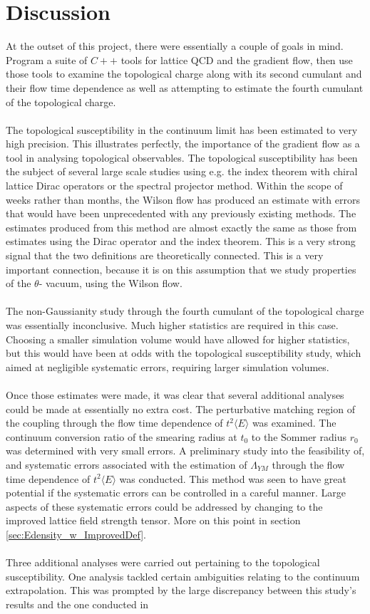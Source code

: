 \documentclass[a4paper,10pt]{book}
\begin{document}
\section{Discussion}
At the outset of this project, there were essentially a couple of goals in mind. Program a suite of $C++$ tools for lattice QCD and the gradient flow, then use those tools to examine the topological charge along with its second cumulant and their flow time dependence as well as attempting to estimate the fourth cumulant of the topological charge.\\\\The topological susceptibility in the continuum limit has been estimated to very high precision. This illustrates perfectly, the importance of the gradient flow as a tool in analysing topological observables. The topological susceptibility has been the subject of several large scale studies using e.g. the index theorem with chiral lattice Dirac operators or the spectral projector method. Within the scope of weeks rather than months, the Wilson flow has produced an estimate with errors that would have been unprecedented with any previously existing methods. The estimates produced from this method are almost exactly the same as those from estimates using the Dirac operator and the index theorem. This is a very strong signal that the two definitions are theoretically connected. This is a very important connection, because it is on this assumption that we study properties of the $\theta$- vacuum, using the Wilson flow.\\\\The non-Gaussianity study through the fourth cumulant of the topological charge was essentially inconclusive. Much higher statistics are required in this case. Choosing a smaller simulation volume would have allowed for higher statistics, but this would have been at odds with the topological susceptibility study, which aimed at negligible systematic errors, requiring larger simulation volumes.\\\\Once those estimates were made, it was clear that several additional analyses could be made at essentially no extra cost. The perturbative matching region of the coupling through the flow time dependence of $t^2\langle E\rangle$ was examined. The continuum conversion ratio of the smearing radius at $t_0$ to the Sommer radius $r_0$ was determined with very small errors. A preliminary study into the feasibility of, and systematic errors associated with the estimation of $\Lambda_{YM}$ through the flow time dependence of $t^2\langle E\rangle$ was conducted. This method was seen to have great potential if the systematic errors can be controlled in a careful manner. Large aspects of these systematic errors could be addressed by changing to the improved lattice field strength tensor. More on this point in section \ref{sec:Edensity_w_ImprovedDef}.\\\\Three additional analyses were carried out pertaining to the topological susceptibility. One analysis tackled certain ambiguities relating to the continuum extrapolation. This was prompted by the large discrepancy between this study's results and the one conducted in 
\end{document}
